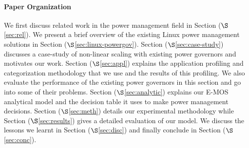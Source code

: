 \paragraph{Paper Organization} 
We first discuss related work in the power management field in Section ($\S$\ref{sec:rel}). 
We present a brief overview of the existing Linux power management solutions in Section ($\S$\ref{sec:linux-powergov}). 
Section ($\S$\ref{sec:case-study}) discusses a case-study of non-linear scaling with existing power governors and motivates our work.
Section ($\S$\ref{sec:appl}) explains the application profiling and categorization methodology that we use and the results of this profiling. 
We also evaluate the performance of the existing power governors in this section and go into some of their problems. Section ($\S$\ref{sec:analytic}) explains
our E-MOS analytical model and the decision table it uses to make power management decisions. Section ($\S$\ref{sec:meth}) details our experimental methodology 
while Section ($\S$\ref{sec:results}) gives a detailed evaluation of our model. We discuss the
lessons we learnt in Section ($\S$\ref{sec:disc}) and finally conclude in Section ($\S$\ref{sec:conc}).


\begin{comment}

This is the old second paragraph, which I've rewritten.

Linux OS provide ACPI~\cite{acpi, freqgov} interfaces to extract information about batteries and other resources, but the power governors don't utilize this information efficiently to make proper energy management decisions. Current policies generally rely on user-specified static parameters to run at a specific lower CPU frequency or lower system power state without considering the applications’ requirements. Many multi-core processors try to improve the applications execution time by running at higher frequencies and thus consume more power (May consume less energy, if the execution time is small). Some applications have more memory accesses, in which case running at higher frequencies always is not beneficial. Many applications are long running jobs which consume lot of energy if run at higher frequency. All these above scenarios suggest that there is ‘NO’ one-size fit all solution for better system energy efficiency. Thus, Linux power governors need more application information, to determine whether to boost the performance or run at lower-power state by continuously monitoring the available battery resource. Our project aims to solve this problem of energy management decision by deriving some of the principles from Liang et. al~\cite{and-dvfs} implemented for Android systems.

\end{comment}
